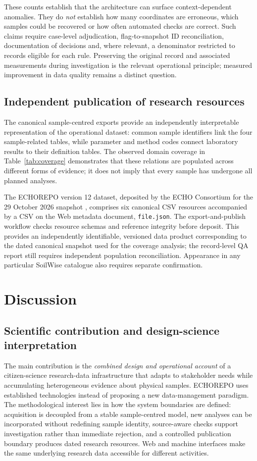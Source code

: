 \documentclass[11pt,a4paper]{article}
\newcommand{\code}[1]{\texttt{#1}}
\begin{document}
These counts establish that the architecture can surface context-dependent anomalies. They do \emph{not} establish how many coordinates are erroneous, which samples could be recovered or how often automated checks are correct. Such claims require case-level adjudication, flag-to-snapshot ID reconciliation, documentation of decisions and, where relevant, a denominator restricted to records eligible for each rule. Preserving the original record and associated measurements during investigation is the relevant operational principle; measured improvement in data quality remains a distinct question.

\subsection{Independent publication of research resources}
The canonical sample-centred exports provide an independently interpretable representation of the operational dataset: common sample identifiers link the four sample-related tables, while parameter and method codes connect laboratory results to their definition tables. The observed domain coverage in Table~\ref{tab:coverage} demonstrates that these relations are populated across different forms of evidence; it does not imply that every sample has undergone all planned analyses.

The ECHOREPO version 12 dataset, deposited by the ECHO Consortium for the 29 October 2026 snapshot \parencite{echorepo2026dataset}, comprises six canonical CSV resources accompanied by a CSV on the Web metadata document, \code{file.json}. The export-and-publish workflow checks resource schemas and reference integrity before deposit. This provides an independently identifiable, versioned data product corresponding to the dated canonical snapshot used for the coverage analysis; the record-level QA report still requires independent population reconciliation. Appearance in any particular SoilWise catalogue also requires separate confirmation.

\section{Discussion}
\subsection{Scientific contribution and design-science interpretation}
The main contribution is the \emph{combined design and operational account} of a citizen-science research-data infrastructure that adapts to stakeholder needs while accumulating heterogeneous evidence about physical samples. ECHOREPO uses established technologies instead of proposing a new data-management paradigm. The methodological interest lies in how the system boundaries are defined: acquisition is decoupled from a stable sample-centred model, new analyses can be incorporated without redefining sample identity, source-aware checks support investigation rather than immediate rejection, and a controlled publication boundary produces dated research resources. Web and machine interfaces make the same underlying research data accessible for different activities.
\end{document}
